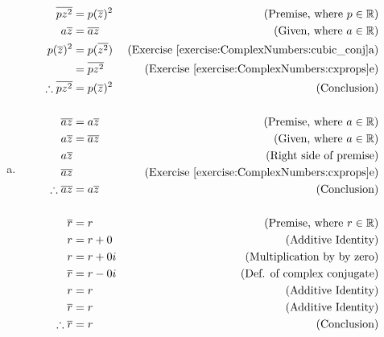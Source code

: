 \begin{enumerate}[(a)]
\item
	\begin{align*}
	\overline{pz^{2}}&= p(\overline{z})^{2}		&\text{(Premise, where}\ p \in {\mathbb{R}})\\
	a\overline{z}&= \overline{az}	&\text{(Given, where}\ a \in {\mathbb{R}})\\
	p(\overline{z})^{2}&= p(\overline{z^{2}}) &\text{(Exercise \ref{exercise:ComplexNumbers:cubic_conj}a)}\\
	&= \overline{pz^{2}} &\text{(Exercise \ref{exercise:ComplexNumbers:cxprops}e)}\\
	\therefore \overline{pz^{2}} &= p(\overline{z})^{2} &\text{(Conclusion)}\\
	\\
	\overline{az}&= a\overline{z}		&\text{(Premise, where}\ a \in {\mathbb{R}})\\
	a\overline{z}&= \overline{az}	&\text{(Given, where}\ a \in {\mathbb{R}})\\
	a\overline{z}& &\text{(Right side of premise)}\\
	\overline{az}& &\text{(Exercise \ref{exercise:ComplexNumbers:cxprops}e)}\\
	\therefore \overline{az} &= a\overline{z} &\text{(Conclusion)}\\
\\
	\overline{r}&= r	&\text{(Premise, where}\ r \in {\mathbb{R}})\\
	r&= r + 0&\text{(Additive Identity)}\\
	r&= r + 0i&\text{(Multiplication by by zero)}\\
	\overline{r}&= r - 0i &\text{(Def. of complex conjugate)}\\
	r&= r &\text{(Additive Identity)}\\
	\overline{r}&= r &\text{(Additive Identity)}\\
	\therefore \overline{r} &= r &\text{(Conclusion)}\\
	\end{align*}
	

\end{enumerate}
